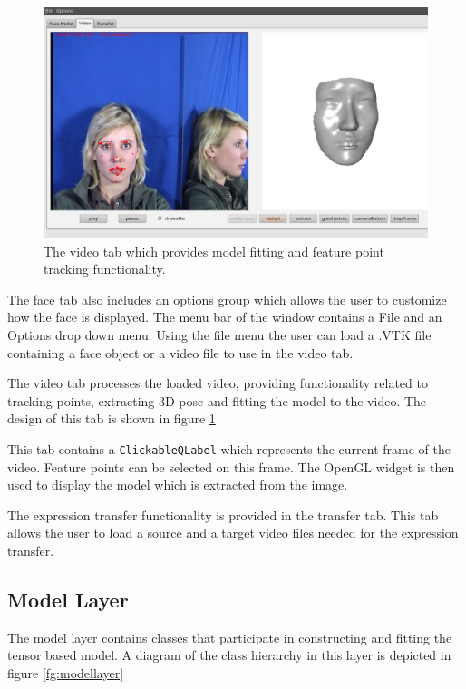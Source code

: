 \documentclass[11pt,a4paper,twoside]{report}
\begin{document}
\begin{figure}[H]
\begin{centering}
\includegraphics[scale=0.35]{images/videotab.png}
\par\end{centering}

\caption{The video tab which provides model fitting and feature point tracking functionality.}
\label{fg:videotab}
\end{figure}

The face tab also includes an options group which allows the user to customize how
the face is displayed. The menu bar of the window contains a File and an
Options drop down menu. Using the file menu the user can load a .VTK file
containing a face object or a video file to use in the video tab.

The video tab processes the loaded video, providing functionality related to tracking points, extracting 3D
pose and fitting the model to the video. The design of this tab is shown in
figure \ref{fg:videotab} 


This tab contains a \texttt{ClickableQLabel} which represents the current frame
of the video. Feature points can be selected on this frame. The 
OpenGL widget is then used to display the model which is extracted from the image.

The expression transfer functionality is provided in the transfer tab. This tab allows the user to load a
source and a target video files needed for the expression transfer.

\subsection{Model Layer}
The model layer contains classes that participate in constructing and fitting
the tensor based model. A diagram of the class hierarchy in this layer is
depicted in figure \ref{fg:modellayer}
\end{document}
